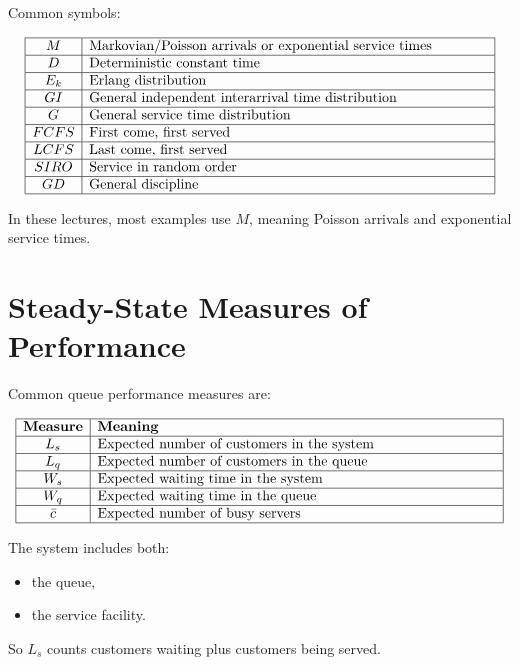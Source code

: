 \documentclass[12pt]{article}
\begin{document}
Common symbols:

\[
\begin{array}{|c|p{10cm}|}
\hline
M & Markovian/Poisson arrivals or exponential service times\\
\hline
D & Deterministic constant time\\
\hline
E_k & Erlang distribution\\
\hline
GI & General independent interarrival time distribution\\
\hline
G & General service time distribution\\
\hline
FCFS & First come, first served\\
\hline
LCFS & Last come, first served\\
\hline
SIRO & Service in random order\\
\hline
GD & General discipline\\
\hline
\end{array}
\]

In these lectures, most examples use \(M\), meaning Poisson arrivals and exponential service times.

\section{Steady-State Measures of Performance}

Common queue performance measures are:

\[
\begin{array}{|c|p{10cm}|}
\hline
\textbf{Measure} & \textbf{Meaning}\\
\hline
L_s & Expected number of customers in the system\\
\hline
L_q & Expected number of customers in the queue\\
\hline
W_s & Expected waiting time in the system\\
\hline
W_q & Expected waiting time in the queue\\
\hline
\bar{c} & Expected number of busy servers\\
\hline
\end{array}
\]

The system includes both:

\begin{itemize}
    \item the queue,
    \item the service facility.
\end{itemize}

So \(L_s\) counts customers waiting plus customers being served.
\end{document}
